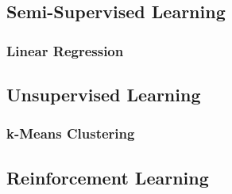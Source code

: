 \documentclass{article}
\begin{document}
\subsection{Semi-Supervised Learning}
\subsubsection{Linear Regression}

\subsection{Unsupervised Learning}
\subsubsection{k-Means Clustering}


\subsection{Reinforcement Learning}





\end{document}
